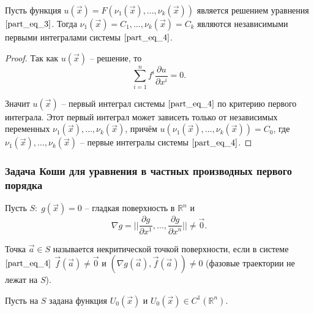 \begin{theorem}
    Пусть функция $u \left( \vec{x} \right) = F \left( \nu_1 \left( \vec{x} \right), \dots, \nu_k \left( \vec{x} \right) \right)$ является решением уравнения $\eqref{part_eq_3}$. Тогда $\nu_1 \left( \vec{x} \right) = C_1, \dots, \nu_k \left( \vec{x} \right) = C_k$ являются независимыми первыми интегралами системы $\eqref{part_eq_4}$. 
\end{theorem}
\begin{proof}
    Так как $u \left( \vec{x} \right)$ -- решение, то 
    \begin{equation*}
        \sum \limits_{i = 1}^{n} f^i \frac{\partial u}{\partial x^i} = 0.
    \end{equation*}
    
    Значит $u \left( \vec{x} \right)$ -- первый интеграл системы $\eqref{part_eq_4}$ по критерию первого интеграла. Этот первый интеграл может зависеть только от независимых переменных $\nu_1 \left( \vec{x} \right), \dots, \nu_k \left( \vec{x} \right)$, причём $u \left( \nu_1 \left( \vec{x} \right), \dots, \nu_k \left( \vec{x} \right) \right) = C_0$, где $\nu_1 \left( \vec{x} \right), \dots, \nu_k \left( \vec{x} \right)$ -- первые интегралы системы $\eqref{part_eq_4}$.
\end{proof}

\subsubsection{Задача Коши для уравнения в частных производных первого порядка}

Пусть $S: \; g \left( \vec{x} \right) = 0$ -- гладкая поверхность в $\mathbb{R}^n$ и 
\begin{equation*}
    \nabla g = \bigg| \bigg| \frac{\partial g}{\partial x^{1}}, \dots, \frac{\partial g}{\partial x^{n}} \bigg| \bigg| \neq \vec{0}.
\end{equation*}

\begin{definition}
    Точка $\vec{a} \in S$ называется некритической точкой поверхности, если в системе $\eqref{part_eq_4}$ $\vec{f} \left( \vec{a} \right) \neq \vec{0}$ и $ \left( \nabla g \left( \vec{a} \right), \vec{f} \left( \vec{a} \right) \right) \neq 0$  (фазовые траектории не лежат на $S$).
\end{definition}

Пусть на $S$ задана функция $U_0 \left( \vec{x} \right)$ и $U_0 \left( \vec{x} \right) \in C^1 \left( \mathbb{R}^n \right)$.

